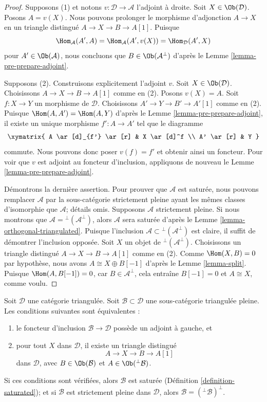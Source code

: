 \begin{proof}
Supposons (1) et notons $v : \mathcal{D} \to \mathcal{A}$ l'adjoint à droite.
Soit $X \in \Ob(\mathcal{D})$. Posons $A = v(X)$. Nous pouvons prolonger le
morphisme d'adjonction $A \to X$ en un triangle distingué
$A \to X \to B \to A[1]$. Puisque
$$
\Hom_\mathcal{A}(A', A) =
\Hom_\mathcal{A}(A', v(X)) =
\Hom_\mathcal{D}(A', X)
$$
pour $A' \in \Ob(\mathcal{A})$, nous concluons que
$B \in \Ob(\mathcal{A}^\perp)$ d'après le
Lemme \ref{lemma-pre-prepare-adjoint}.

\medskip\noindent
Supposons (2). Construisons explicitement l'adjoint $v$.
Soit $X \in \Ob(\mathcal{D})$. Choisissons $A \to X \to B \to A[1]$ comme
en (2). Posons $v(X) = A$. Soit $f : X \to Y$ un morphisme de $\mathcal{D}$.
Choisissons $A' \to Y \to B' \to A'[1]$ comme en (2). Puisque
$\Hom(A, A') = \Hom(A, Y)$ d'après le
Lemme \ref{lemma-pre-prepare-adjoint}, il existe un unique morphisme
$f' : A \to A'$ tel que le diagramme
$$
\xymatrix{
A \ar[d]_{f'} \ar[r] & X \ar[d]^f \\
A' \ar[r] & Y
}
$$
commute. Nous pouvons donc poser $v(f) = f'$ et obtenir ainsi un foncteur.
Pour voir que $v$ est adjoint au foncteur d'inclusion, appliquons de nouveau le
Lemme \ref{lemma-pre-prepare-adjoint}.

\medskip\noindent
Démontrons la dernière assertion. Pour prouver que $\mathcal{A}$ est saturée,
nous pouvons remplacer $\mathcal{A}$ par la sous-catégorie strictement pleine
ayant les mêmes classes d'isomorphie que $\mathcal{A}$; détails omis.
Supposons $\mathcal{A}$
strictement pleine. Si nous montrons que
$\mathcal{A} = {}^\perp(\mathcal{A}^\perp)$, alors $\mathcal{A}$ sera saturée
d'après le Lemme \ref{lemma-orthogonal-triangulated}.
Puisque l'inclusion
$\mathcal{A} \subset {}^\perp(\mathcal{A}^\perp)$ est claire, il suffit de
démontrer l'inclusion opposée.
Soit $X$ un objet de ${}^\perp(\mathcal{A}^\perp)$.
Choisissons un triangle distingué $A \to X \to B \to A[1]$ comme en (2).
Comme $\Hom(X, B) = 0$ par hypothèse, nous avons
$A \cong X \oplus B[-1]$ d'après le Lemme \ref{lemma-split}.
Puisque $\Hom(A, B[-1]) = 0$, car $B \in \mathcal{A}^\perp$, cela entraîne
$B[-1] = 0$ et $A \cong X$, comme voulu.
\end{proof}

\begin{lemma}
\label{lemma-left-adjoint}
Soit $\mathcal{D}$ une catégorie triangulée. Soit
$\mathcal{B} \subset \mathcal{D}$ une sous-catégorie triangulée pleine.
Les conditions suivantes sont équivalentes :
\begin{enumerate}
\item le foncteur d'inclusion $\mathcal{B} \to \mathcal{D}$ possède un
adjoint à gauche, et
\item pour tout $X$ dans $\mathcal{D}$, il existe un triangle distingué
$$
A \to X \to B \to A[1]
$$
dans $\mathcal{D}$, avec $B \in \Ob(\mathcal{B})$ et
$A \in \Ob({}^\perp\mathcal{B})$.
\end{enumerate}
Si ces conditions sont vérifiées, alors $\mathcal{B}$ est saturée
(Définition \ref{definition-saturated}); et si $\mathcal{B}$ est strictement
pleine dans $\mathcal{D}$, alors
$\mathcal{B} = ({}^\perp\mathcal{B})^\perp$.
\end{lemma}

